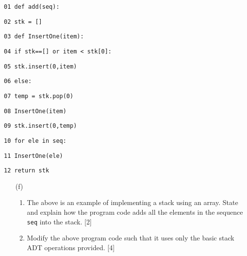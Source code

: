\noindent\begin{minipage}[t]{1\columnwidth}%
\texttt{01 def add(seq): }

\texttt{02 \qquad{}stk = {[}{]} }

\texttt{03 \qquad{}def InsertOne(item): }

\texttt{04 \qquad{}\qquad{}if stk=={[}{]} or item < stk{[}0{]}:}

\texttt{05 \qquad{}\qquad{}\qquad{}stk.insert(0,item) }

\texttt{06 \qquad{}else: }

\texttt{07 \qquad{}\qquad{}temp = stk.pop(0) }

\texttt{08 \qquad{}\qquad{}InsertOne(item) }

\texttt{09 \qquad{}\qquad{}stk.insert(0,temp) }

\texttt{10 \qquad{}for ele in seq: }

\texttt{11 \qquad{}\qquad{}InsertOne(ele) }

\texttt{12 \qquad{}return stk }%
\end{minipage}
\begin{enumerate}
\item[(f)] {}
\begin{enumerate}
\item The above is an example of implementing a stack using an array. State
and explain how the program code adds all the elements in the sequence
\texttt{seq} into the stack. \hfill{}{[}2{]} 
\item Modify the above program code such that it uses only the basic stack
ADT operations provided. \hfill{}{[}4{]}
\end{enumerate}
\end{enumerate}